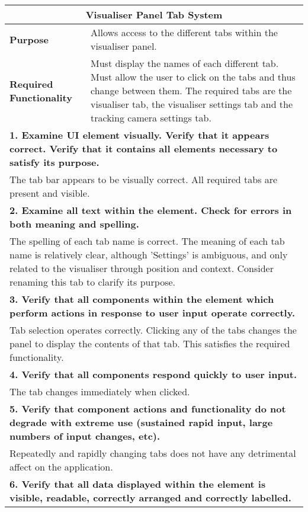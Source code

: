 \begin{longtable}{ l p{10cm} }
 \hline
 \multicolumn{2}{c}{\textbf{Visualiser Panel Tab System}}\\
 \hline
 \textbf{Purpose} & Allows access to the different tabs within the visualiser panel.\\
 \textbf{Required Functionality} & Must display the names of each different tab. Must allow the user to click on the tabs and thus change between them. The required tabs are the visualiser tab, the visualiser settings tab and the tracking camera settings tab.\\
 \hline
 \multicolumn{2}{p{14cm}}{\textbf{1. Examine UI element visually. Verify that it appears correct. Verify that it contains all elements necessary to satisfy its purpose.}}\\
 \multicolumn{2}{p{14cm}}{The tab bar appears to be visually correct. All required tabs are present and visible.}\\
 \hline
 \multicolumn{2}{p{14cm}}{\textbf{2. Examine all text within the element. Check for errors in both meaning and spelling.}}\\
 \multicolumn{2}{p{14cm}}{The spelling of each tab name is correct. The meaning of each tab name is relatively clear, although 'Settings' is ambiguous, and only related to the visualiser through position and context. Consider renaming this tab to clarify its purpose.}\\
 \hline
 \multicolumn{2}{p{14cm}}{\textbf{3. Verify that all components within the element which perform actions in response to user input operate correctly.}}\\
 \multicolumn{2}{p{14cm}}{Tab selection operates correctly. Clicking any of the tabs changes the panel to display the contents of that tab. This satisfies the required functionality.}\\
 \hline
 \multicolumn{2}{p{14cm}}{\textbf{4. Verify that all components respond quickly to user input.}}\\
 \multicolumn{2}{p{14cm}}{The tab changes immediately when clicked.}\\
 \hline
 \multicolumn{2}{p{14cm}}{\textbf{5. Verify that component actions and functionality do not degrade with extreme use (sustained rapid input, large numbers of input changes, etc).}}\\
 \multicolumn{2}{p{14cm}}{Repeatedly and rapidly changing tabs does not have any detrimental affect on the application.}\\
 \hline
 \multicolumn{2}{p{14cm}}{\textbf{6. Verify that all data displayed within the element is visible, readable, correctly arranged and correctly labelled.}}\\

\end{longtable}
